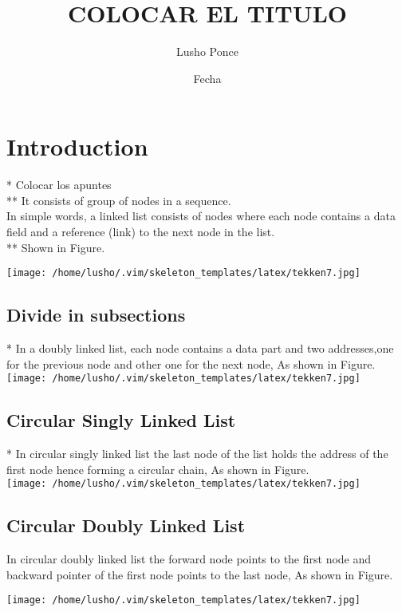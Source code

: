 \documentclass{article}
\title{COLOCAR EL TITULO}
\author{Lusho Ponce}
\date{Fecha}
\begin{document}
\maketitle

\section{Introduction}
* Colocar los apuntes \\ 
** It consists of group of nodes in a sequence.\\
In simple words, a linked list consists of nodes where each node contains a data field and a reference (link) to the next node in the list.\\
** Shown in Figure.  

\texttt{[image: /home/lusho/.vim/skeleton\_templates/latex/tekken7.jpg]}
\subsection{Divide in subsections}
* In a doubly linked list, each node contains a data part
and two addresses,one for the previous node and other one for the next node, As shown in Figure.\\
\texttt{[image: /home/lusho/.vim/skeleton\_templates/latex/tekken7.jpg]}
\subsection{ Circular Singly Linked List}
* In circular singly linked list the last node of the list holds the address of the first node hence forming a circular chain, As shown in Figure.\\
\texttt{[image: /home/lusho/.vim/skeleton\_templates/latex/tekken7.jpg]}

\subsection{ Circular Doubly Linked List}
In circular doubly linked list the forward node points to the first node and backward pointer of the first node points to the last node, As shown in Figure.


\texttt{[image: /home/lusho/.vim/skeleton\_templates/latex/tekken7.jpg]}
\end{document}
